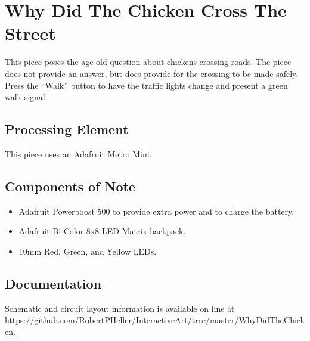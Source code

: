 %
%
%
%
% 
%
%
%
%
%
% 
%

\section{Why Did The Chicken Cross The Street}

This piece poses the age old question about chickens crossing roads.  The 
piece does not provide an answer, but does provide for the crossing to be made 
safely.  Press the ``Walk'' button to have the traffic lights change and 
present a green walk signal.

\subsection*{Processing Element}

This piece uses an Adafruit Metro Mini. 

\subsection*{Components of Note}

\begin{itemize}
\item Adafruit Powerboost 500 to provide extra power and to charge the 
battery.
\item Adafruit Bi-Color 8x8 LED Matrix backpack.
\item 10mm Red, Green, and Yellow LEDs.
\end{itemize}

\subsection*{Documentation}

Schematic and circuit layout information is available on line at 
\url{https://github.com/RobertPHeller/InteractiveArt/tree/master/WhyDidTheChicken}.

